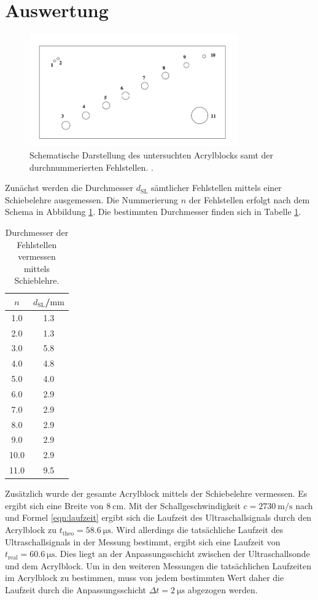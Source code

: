 \section{Auswertung}
\label{sec:Auswertung}
\begin{figure}
  \centering
  \includegraphics[width=0.8\textwidth]{Bilder/fehlstellen.png}
  \caption{Schematische Darstellung des untersuchten Acrylblocks samt der durchnummerierten Fehlstellen. \cite{Anleitung}.}
  \label{fig:fehlstellen}
\end{figure}
Zunächst werden die Durchmesser $d_\mathrm{SL}$ sämtlicher Fehlstellen mittels einer Schiebelehre ausgemessen. Die Nummerierung $n$ der Fehlstellen erfolgt nach dem Schema in Abbildung \ref{fig:fehlstellen}. Die bestimmten Durchmesser finden sich in Tabelle \ref{tab:fehlstellen}.
\begin{table}
  \centering
	\caption{Durchmesser der Fehlstellen vermessen mittels Schieblehre.}
	\label{tab:fehlstellen}
	\begin{tabular}{cc}
		\toprule
    $n$ & $d_\mathrm{SL}$/$\si{\milli\meter}$ \\
		\midrule
1.0 & 1.3 \\
2.0 & 1.3 \\
3.0 & 5.8 \\
4.0 & 4.8 \\
5.0 & 4.0 \\
6.0 & 2.9 \\
7.0 & 2.9 \\
8.0 & 2.9 \\
9.0 & 2.9 \\
10.0 & 2.9 \\
11.0 & 9.5 \\
\bottomrule
\end{tabular}
\end{table}
Zusätzlich wurde der gesamte Acrylblock mittels der Schiebelehre vermessen. Es ergibt sich eine Breite von ${\SI{8}{\centi\meter}}$. Mit der Schallgeschwindigkeit ${c=\SI{2730}{\meter\per\second}}$ nach \cite{schall} und Formel \eqref{eqn:laufzeit} ergibt sich die Laufzeit des Ultraschallsignals durch den Acrylblock zu ${t_{\mathrm{theo}}=\SI{58.6}{\micro\second}}$.
Wird allerdings die tatsächliche Laufzeit des Ultraschallsignals in der Messung bestimmt, ergibt sich eine Laufzeit von ${t_\mathrm{real}=\SI{60.6}{\micro\second}}$. Dies liegt an der Anpassungsschicht zwischen der Ultraschallsonde und dem Acrylblock. Um in den weiteren Messungen die tatsächlichen Laufzeiten im Acrylblock zu bestimmen, muss von jedem bestimmten Wert daher die Laufzeit durch die Anpassungsschicht ${\Delta t=\SI{2}{\micro\second}}$ abgezogen werden.

